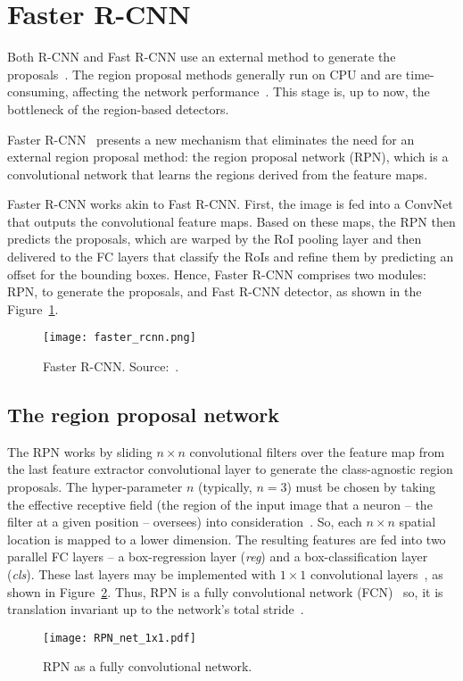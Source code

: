 \section{Faster R-CNN}
%
Both R-CNN and Fast R-CNN use an external method to generate the proposals~\cite{Girshick2016RCNN, Girshick2015}.
The region proposal methods generally run on CPU and are time-consuming, affecting the network performance~\cite{Ren2017fasterpami}.
This stage is, up to now, the bottleneck of the region-based detectors.

Faster R-CNN~\cite{Ren2017fasterpami} presents a new mechanism that eliminates the need for an external region proposal method:
the region proposal network (RPN),
which is a convolutional network that learns the regions derived from the feature maps.

Faster R-CNN works akin to Fast R-CNN. First, the image is fed into a ConvNet that outputs the convolutional feature maps.
Based on these maps, the RPN then predicts the proposals, which are warped by the RoI pooling layer and then delivered to the FC layers that classify the RoIs and refine them by predicting an offset for the bounding boxes.
Hence, Faster R-CNN comprises two modules: RPN, to generate the proposals, and Fast R-CNN detector, as shown in the Figure~\ref{fig:Faster_R-CNN}.
%
%
\begin{figure}[th!]
	\centering
	\texttt{[image: faster\_rcnn.png]}
	\caption[Faster R-CNN]{Faster R-CNN. Source:~\cite{Ren2017fasterpami}.
	}
	\label{fig:Faster_R-CNN}
\end{figure}


\subsection{The region proposal network}\label{sec:rpn}
%
The RPN works by sliding $n\times n$ convolutional filters over the feature map from the last feature extractor convolutional layer to generate the class-agnostic region proposals.
The hyper-parameter $n$ (typically, $n=3$) must be chosen by taking the effective receptive field
(the region of the input image that a neuron -- the filter at a given position -- oversees)
into consideration~\cite{Ren2017fasterpami}.
So, each $n\times n$ spatial location is mapped to a lower dimension.
The resulting features are fed into two parallel FC layers -- a box-regression layer ({\it reg}) and a box-classification layer ({\it cls}).
These last layers may be implemented with $1\times 1$ convolutional layers~\cite{Ren2017fasterpami}, as shown in Figure~\ref{fig:rpn_fcn}.
Thus, RPN is a fully convolutional network (FCN)~\cite{Shelhamer2017} so, it is translation invariant up to the network's total stride~\cite{Ren2017fasterpami}.
%
%
%
\begin{figure}[bh!]
	\centering
	\texttt{[image: RPN\_net\_1x1.pdf]}
	\caption{RPN as a fully convolutional network.}
	\label{fig:rpn_fcn}
\end{figure}

